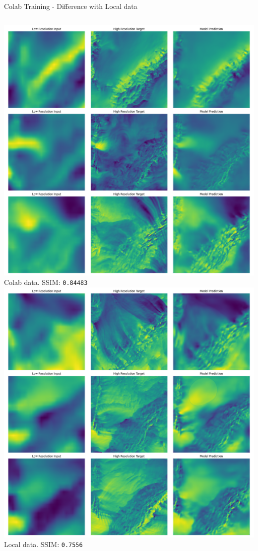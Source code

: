 \documentclass[8pt]{beamer}
\begin{document}
\begin{frame}{Colab Training - Difference with Local data}
    \begin{columns}
            \includegraphics[width=\linewidth]{images/colab_vector_unet_L1SSIM_loss_300_epochs_8_batch_1em3_lr_1em5_weightdecay_best.pt.png}
            \newline
            \centering \small Colab data. SSIM: \texttt{0.84483}
            \includegraphics[width=\linewidth]{images/unet_vectors_l1ssim_loss_200_epochs_4_batch_1em3_lr_1em5_weightdecay.png}
            \newline
            \centering \small Local data. SSIM: \texttt{0.7556}
    \end{columns}
\end{frame}
\end{document}

